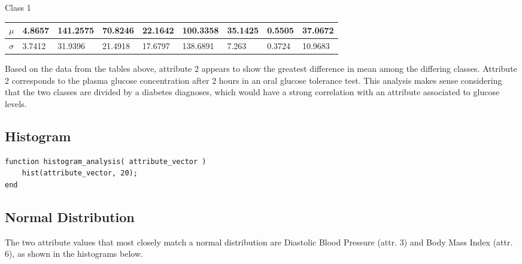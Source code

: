 \documentclass[12pt, letterpaper]{report}
\begin{document}
Class 1

\begin{center}
	\begin{tabular}{ |l|l|l|l|l|l|l|l|l| } 
		\hline
		$\mu$ & 4.8657 & 141.2575 & 70.8246 & 22.1642 & 100.3358 & 35.1425 & 0.5505 & 37.0672 \\
		\hline
		$\sigma$ & 3.7412 & 31.9396 & 21.4918 & 17.6797 & 138.6891 & 7.263 & 0.3724 & 10.9683 \\
		\hline
	\end{tabular}
\end{center}

Based on the data from the tables above, attribute 2 appears to show the greatest difference in mean among the differing classes. Attribute 2 corresponds to the plasma glucose concentration after 2 hours in an oral glucose tolerance test. This analysis makes sense considering that the two classes are divided by a diabetes diagnoses, which would have a strong correlation with an attribute associated to glucose levels.

\subsection{Histogram}

\begin{verbatim}
function histogram_analysis( attribute_vector )
    hist(attribute_vector, 20);
end
\end{verbatim}

\subsection{Normal Distribution}

The two attribute values that most closely match a normal distribution are Diastolic Blood Pressure (attr. 3) and Body Mass Index (attr. 6), as shown in the histograms below.

\begin{figure}[H]
	\captionsetup[subfigure]{labelformat=empty}
	\centering
	\qquad
	\label{fig:example}
\end{figure}
\end{document}
